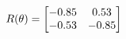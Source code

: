 \documentclass[preview]{standalone}
\begin{document}
\begin{align*}
\special{dvisvgm:raw <g id='unique000'>}R(\theta) = \begin{bmatrix}-0.85 & 0.53\\-0.53 & -0.85\end{bmatrix}\special{dvisvgm:raw </g>}
\end{align*}
\end{document}
